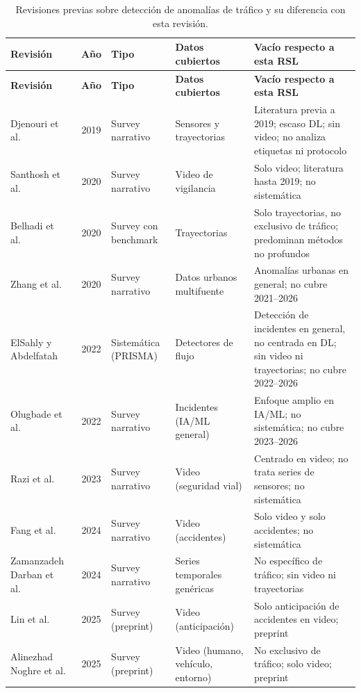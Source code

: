 \begingroup
\small
\begin{xltabular}{\linewidth}{lcp{2.2cm}p{2.6cm}Y}
\caption{Revisiones previas sobre detecci\'{o}n de anomal\'{i}as de tr\'{a}fico y su diferencia con esta revisi\'{o}n.}\label{tab:previas}\\
\toprule
\textbf{Revisi\'{o}n} & \textbf{A\~{n}o} & \textbf{Tipo} & \textbf{Datos cubiertos} & \textbf{Vac\'{i}o respecto a esta RSL} \\
\midrule\endfirsthead
\toprule
\textbf{Revisi\'{o}n} & \textbf{A\~{n}o} & \textbf{Tipo} & \textbf{Datos cubiertos} & \textbf{Vac\'{i}o respecto a esta RSL} \\
\midrule\endhead
\bottomrule\endfoot
Djenouri et al.~\cite{djenouri2019survey} & 2019 & Survey narrativo & Sensores y trayectorias & Literatura previa a 2019; escaso DL; sin video; no analiza etiquetas ni protocolo \\
Santhosh et al.~\cite{santhosh2020anomaly} & 2020 & Survey narrativo & Video de vigilancia & Solo video; literatura hasta 2019; no sistemática \\
Belhadi et al.~\cite{belhadi2020trajectory} & 2020 & Survey con benchmark & Trayectorias & Solo trayectorias, no exclusivo de tráfico; predominan métodos no profundos \\
Zhang et al.~\cite{zhang2020urban} & 2020 & Survey narrativo & Datos urbanos multifuente & Anomalías urbanas en general; no cubre 2021--2026 \\
ElSahly y Abdelfatah~\cite{elsahly2022systematic} & 2022 & Sistemática (PRISMA) & Detectores de flujo & Detección de incidentes en general, no centrada en DL; sin video ni trayectorias; no cubre 2022--2026 \\
Olugbade et al.~\cite{olugbade2022review} & 2022 & Survey narrativo & Incidentes (IA/ML general) & Enfoque amplio en IA/ML; no sistemática; no cubre 2023--2026 \\
Razi et al.~\cite{razi2023deep} & 2023 & Survey narrativo & Video (seguridad vial) & Centrado en video; no trata series de sensores; no sistemática \\
Fang et al.~\cite{fang2024vision} & 2024 & Survey narrativo & Video (accidentes) & Solo video y solo accidentes; no sistemática \\
Zamanzadeh Darban et al.~\cite{darban2024deep} & 2024 & Survey narrativo & Series temporales genéricas & No específico de tráfico; sin video ni trayectorias \\
Lin et al.~\cite{lin2025deep} & 2025 & Survey (preprint) & Video (anticipación) & Solo anticipación de accidentes en video; preprint \\
Alinezhad Noghre et al.~\cite{alinezhadnoghre2025survey} & 2025 & Survey (preprint) & Video (humano, vehículo, entorno) & No exclusivo de tráfico; solo video; preprint \\
\end{xltabular}
\endgroup
